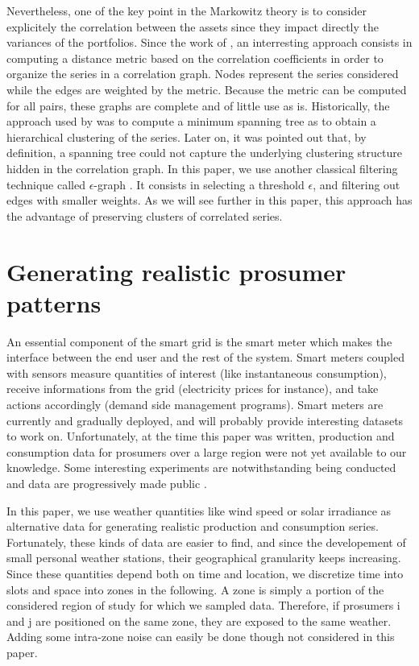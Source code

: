 \documentclass[conference]{IEEEtran}
\begin{document}
Nevertheless, one of the key point in the Markowitz theory is to consider explicitely the correlation between the assets since they impact directly the variances of the portfolios. Since the work of \cite{Mantegna1999}, an interresting approach consists in computing a distance metric based on the correlation coefficients in order to organize the series in a correlation graph. Nodes represent the series considered while the edges are weighted by the metric. Because the metric can be computed for all pairs, these graphs are complete and of little use as is. Historically, the approach used by \cite{Mantegna1999} was to compute a minimum spanning tree as to obtain a hierarchical clustering of the series. Later on, it was pointed out that, by definition, a spanning tree could not capture the underlying clustering structure hidden in the correlation graph. In this paper, we use another classical filtering technique called $ \epsilon $-graph \cite{Garas2008}. It consists in selecting a threshold $ \epsilon $, and filtering out edges with smaller weights. As we will see further in this paper, this approach has the advantage of preserving clusters of correlated series.


%
%

\section{Generating realistic prosumer patterns}
\label{sec:data}

An essential component of the smart grid is the smart meter which makes the interface between the end user and the rest of the system. Smart meters coupled with sensors measure quantities of interest (like instantaneous consumption), receive informations from the grid (electricity prices for instance), and take actions accordingly (demand side management programs). Smart meters are currently and gradually deployed, and will probably provide interesting datasets to work on. Unfortunately, at the time this paper was written, production and consumption data for prosumers over a large region were not yet available to our knowledge. Some interesting experiments are notwithstanding being conducted and data are progressively made public \cite{ISSDA}. 

In this paper, we use weather quantities like wind speed or solar irradiance as alternative data for generating realistic production and consumption series. Fortunately, these kinds of data are easier to find, and since the developement of small personal weather stations, their geographical granularity keeps increasing.  Since these quantities depend both on time and location, we discretize time into slots and space into zones in the following. A zone is simply a portion of the considered region of study for which we sampled data. Therefore, if prosumers i and j are positioned on the same zone, they are exposed to the same weather. Adding some intra-zone noise can easily be done though not considered in this paper.
\end{document}
